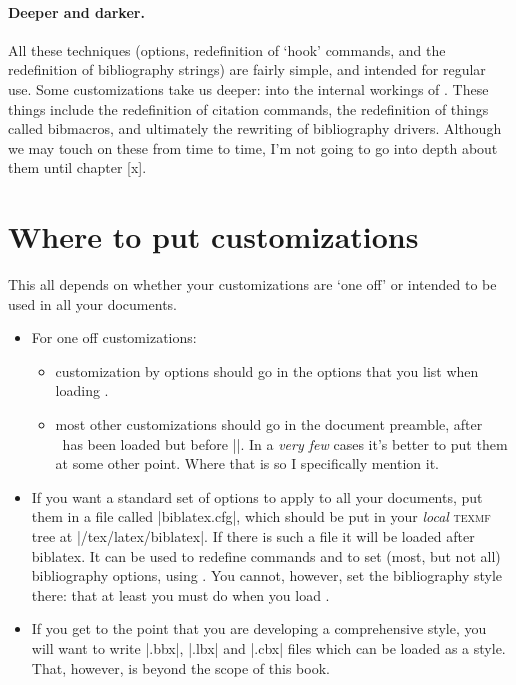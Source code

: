 \paragraph{Deeper and darker.}
All these techniques (options, redefinition of `hook' commands, and
the redefinition of bibliography strings) are fairly simple, and
intended for regular use. Some customizations take us deeper: into the
internal workings of \biblatex. These things include the redefinition
of citation commands, the redefinition of things called bibmacros, and
ultimately the rewriting of bibliography drivers. Although we may
touch on these from time to time, I'm not going to go into depth about
them until chapter [x].

\section{Where to put customizations}

This all depends on whether your customizations are `one off' or
intended to be used in all your documents.
\begin{itemize}
\item For one off customizations:
\begin{itemize}
\item customization by options should go in the options that you list
  when loading \biblatex.
\item most other customizations should go in the document preamble, after
  \biblatex\ has been loaded but before ||. In a \emph{very
  few} cases it's better to put them at some other point. Where that is so
  I specifically mention it.
\end{itemize}
\item If you want a standard set of options to apply to all your
  documents, put them in a file called |biblatex.cfg|, which should be put in your
  \emph{local} \textsc{texmf} tree at |/tex/latex/biblatex|. If there is such
  a file it will be loaded after biblatex. It can be used to redefine commands
  and to set (most, but not all) bibliography options, using . You cannot, however, set the bibliography style there: that at least you must do when you load \biblatex.
\item If you get to the point that you are developing a comprehensive style, you will want to write |.bbx|, |.lbx| and |.cbx| files which can be loaded as a style. That, however, is beyond the scope of this book.
\end{itemize}
